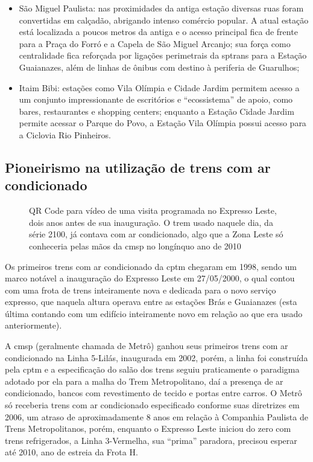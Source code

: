\documentclass[11pt,fleqn]{book} %
\begin{document}
\begin{itemize}
\begin{itemize}
			\item São Miguel Paulista: nas proximidades da antiga estação diversas ruas foram convertidas em calçadão, abrigando intenso comércio popular. A atual estação está localizada a poucos metros da antiga e o acesso principal fica de frente para a Praça do Forró e a Capela de São Miguel Arcanjo; sua força como centralidade fica reforçada por ligações perimetrais da \gls{sptrans} para a Estação Guaianazes, além de linhas de ônibus com destino à periferia de Guarulhos;
			\item Itaim Bibi: estações como Vila Olímpia e Cidade Jardim permitem acesso a um conjunto impressionante de escritórios e “ecossistema” de apoio, como bares, restaurantes e shopping centers; enquanto a Estação Cidade Jardim permite acessar o Parque do Povo, a Estação Vila Olímpia possui acesso para a Ciclovia Rio Pinheiros.
		\end{itemize}
\end{itemize}

\subsection{Pioneirismo na utilização de trens com ar condicionado}

\begin{wrapfigure}{l}{0.5\textwidth}
	\centering
	\caption[QR Code para vídeo do Expresso Leste em 1998]{QR Code para vídeo de uma visita programada no Expresso Leste, dois anos antes de sua inauguração. O trem usado naquele dia, da série 2100, já contava com ar condicionado, algo que a Zona Leste só conheceria pelas mãos da \gls{cmsp} no longínquo ano de 2010}
	\label{qr:video_1998_l11}
\end{wrapfigure}

Os primeiros trens com ar condicionado da \gls{cptm} chegaram em 1998, sendo um marco notável a inauguração do Expresso Leste em 27/05/2000, o qual contou com uma frota de trens inteiramente nova e dedicada para o novo serviço expresso, que naquela altura operava entre as estações Brás e Guaianazes (esta última contando com um edifício inteiramente novo em relação ao que era usado anteriormente).

A \glsdesc{cmsp} (geralmente chamada de Metrô) ganhou seus primeiros trens com ar condicionado na Linha 5-Lilás, inaugurada em 2002, porém, a linha foi construída pela \gls{cptm} e a especificação do salão dos trens seguiu praticamente o paradigma adotado por ela para a malha do Trem Metropolitano, daí a presença de ar condicionado, bancos com revestimento de tecido e portas entre carros. O Metrô só receberia trens com ar condicionado especificado conforme suas diretrizes em 2006, um atraso de aproximadamente 8 anos em relação à Companhia Paulista de Trens Metropolitanos, porém, enquanto o Expresso Leste iniciou do zero com trens refrigerados, a Linha 3-Vermelha, sua “prima” paradora, precisou esperar até 2010, ano de estreia da Frota H.
\end{document}
